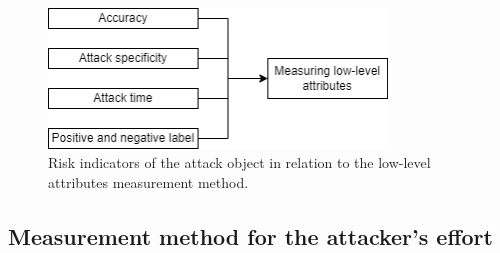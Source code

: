 \begin{figure}[ht!]
  \centering
  \includegraphics[width=9cm]{pictures/measure_damage.png}
  \caption{Risk indicators of the attack object in relation to the low-level attributes measurement method.}
  \label{fig:measure_damage}
\end{figure}

\subsection*{Measurement method for the attacker's effort}
\label{sec:find_effort}

